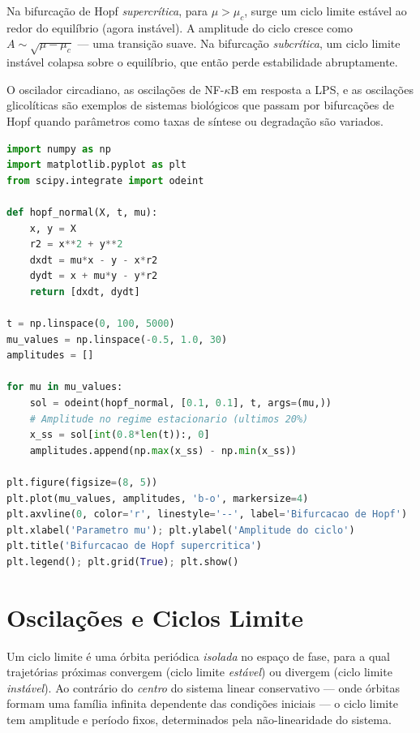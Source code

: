 Na bifurcação de Hopf \emph{supercrítica}, para $\mu > \mu_c$, surge um ciclo limite
estável ao redor do equilíbrio (agora instável). A amplitude do ciclo cresce como
$A \sim \sqrt{\mu - \mu_c}$ --- uma transição suave. Na bifurcação \emph{subcrítica}, um
ciclo limite instável colapsa sobre o equilíbrio, que então perde estabilidade abruptamente.

O oscilador circadiano, as oscilações de NF-$\kappa$B em resposta a LPS, e as oscilações
glicolíticas são exemplos de sistemas biológicos que passam por bifurcações de Hopf quando
parâmetros como taxas de síntese ou degradação são variados.

\begin{lstlisting}[language=Python, caption=Diagrama de bifurcacao via varredura de parametro]
import numpy as np
import matplotlib.pyplot as plt
from scipy.integrate import odeint

def hopf_normal(X, t, mu):
    x, y = X
    r2 = x**2 + y**2
    dxdt = mu*x - y - x*r2
    dydt = x + mu*y - y*r2
    return [dxdt, dydt]

t = np.linspace(0, 100, 5000)
mu_values = np.linspace(-0.5, 1.0, 30)
amplitudes = []

for mu in mu_values:
    sol = odeint(hopf_normal, [0.1, 0.1], t, args=(mu,))
    # Amplitude no regime estacionario (ultimos 20%)
    x_ss = sol[int(0.8*len(t)):, 0]
    amplitudes.append(np.max(x_ss) - np.min(x_ss))

plt.figure(figsize=(8, 5))
plt.plot(mu_values, amplitudes, 'b-o', markersize=4)
plt.axvline(0, color='r', linestyle='--', label='Bifurcacao de Hopf')
plt.xlabel('Parametro mu'); plt.ylabel('Amplitude do ciclo')
plt.title('Bifurcacao de Hopf supercritica')
plt.legend(); plt.grid(True); plt.show()
\end{lstlisting}

\section{Oscilações e Ciclos Limite}

\begin{definicaoenv}
Um ciclo limite é uma órbita periódica \emph{isolada} no espaço de fase, para a qual
trajetórias próximas convergem (ciclo limite \emph{estável}) ou divergem (ciclo limite
\emph{instável}). Ao contrário do \emph{centro} do sistema linear conservativo --- onde
órbitas formam uma família infinita dependente das condições iniciais --- o ciclo limite tem
amplitude e período fixos, determinados pela não-linearidade do sistema.
\end{definicaoenv}

